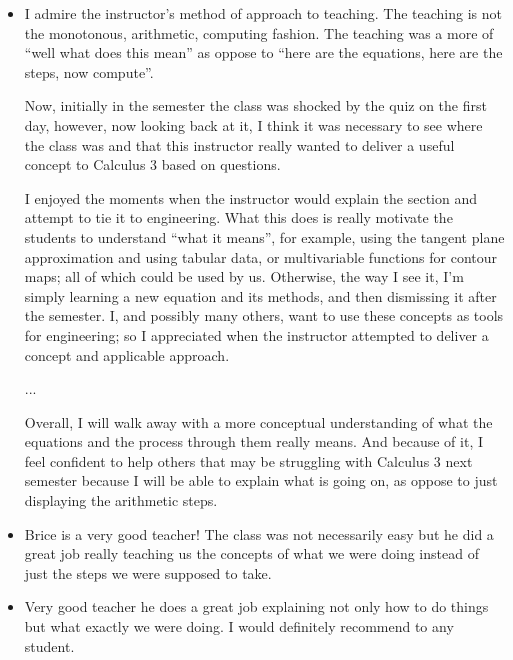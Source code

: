 \documentclass[11pt]{article}
\begin{document}
\begin{itemize}
		\item{}
      I admire the instructor's method of approach to teaching.
      The teaching is not the monotonous, arithmetic, computing fashion.
      The teaching was a more of ``well what does this mean'' as oppose
      to ``here are the equations, here are the steps, now compute''.

      Now, initially in the semester the class was shocked by the quiz
      on the first day, however, now looking back at it, I think it was
      necessary to see where the class was and that this instructor
      really wanted to deliver a useful concept to Calculus 3 based on
      questions.

      I enjoyed the moments when the instructor would explain the
      section and attempt to tie it to engineering.
      What this does is really motivate the students to understand
      ``what it means'', for example, using the tangent plane
      approximation and using tabular data, or multivariable functions
      for contour maps; all of which could be used by us.
      Otherwise, the way I see it, I'm simply learning a new equation
      and its methods, and then dismissing it after the semester.
      I, and possibly many others, want to use these concepts as tools
      for engineering;
      so I appreciated when the instructor attempted to deliver a
      concept and applicable approach.

      ...

      Overall, I will walk away with a more conceptual understanding of
      what the equations and the process through them really means.
      And because of it, I feel confident to help others that may be
      struggling with Calculus 3 next semester because I will be able to
      explain what is going on, as oppose to just displaying the
      arithmetic steps.
	\end{itemize}


	\begin{itemize}
	
		\item{}
      Brice is a very good teacher!
      The class was not necessarily easy but he did a great job really
      teaching us the concepts of what we were doing instead of just the
      steps we were supposed to take.
		
		\item{}
      Very good teacher he does a great job explaining not only how to
      do things but what exactly we were doing.
      I would definitely recommend to any student.
	\end{itemize}
\end{document}

